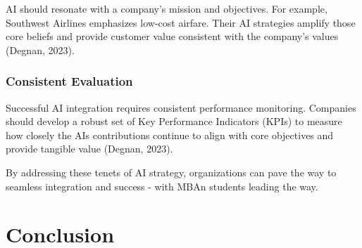 \documentclass[
]{book}
\begin{document}
AI should resonate with a company's mission and objectives. For example, Southwest Airlines emphasizes low-cost airfare. Their AI strategies amplify those core beliefs and provide customer value consistent with the company's values (Degnan, 2023).

\hypertarget{consistent-evaluation}{%
\subsection{Consistent Evaluation}\label{consistent-evaluation}}

Successful AI integration requires consistent performance monitoring. Companies should develop a robust set of Key Performance Indicators (KPIs) to measure how closely the AIs contributions continue to align with core objectives and provide tangible value (Degnan, 2023).

By addressing these tenets of AI strategy, organizations can pave the way to seamless integration and success - with MBAn students leading the way.

\hypertarget{conclusion}{%
\chapter{Conclusion}\label{conclusion}}
\end{document}
